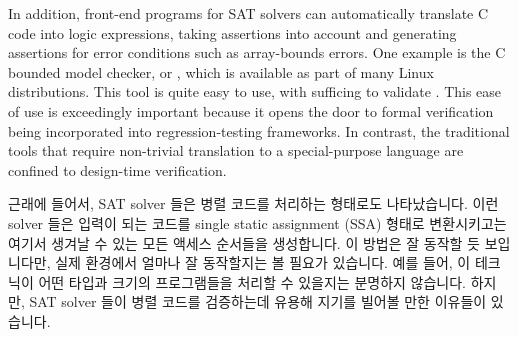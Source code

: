 In addition, front-end programs for SAT solvers can automatically translate
C code into logic expressions, taking assertions into account and generating
assertions for error conditions such as array-bounds errors.
One example is the C bounded model checker, or , which is
available as part of many Linux distributions.
This tool is quite easy to use, with  sufficing to
validate .
This ease of use is exceedingly important because it opens the door
to formal verification being incorporated into regression-testing
frameworks.
In contrast, the traditional tools that require non-trivial translation
to a special-purpose language are confined to design-time verification.
\fi

근래에 들어서, SAT solver 들은 병렬 코드를 처리하는 형태로도 나타났습니다.
이런 solver 들은 입력이 되는 코드를 single static assignment (SSA) 형태로
변환시키고는 여기서 생겨날 수 있는 모든 액세스 순서들을 생성합니다.
이 방법은 잘 동작할 듯 보입니다만, 실제 환경에서 얼마나 잘 동작할지는 볼 필요가
있습니다.
예를 들어, 이 테크닉이 어떤 타입과 크기의 프로그램들을 처리할 수 있을지는
분명하지 않습니다.
하지만, SAT solver 들이 병렬 코드를 검증하는데 유용해 지기를 빌어볼 만한
이유들이 있습니다.
\iffalse

More recently, SAT solvers have appeared that handle parallel code.
These solvers operate by converting the input code into single static
assignment (SSA) form, then generating all permitted access orders.
This approach seems promising, but it remains to be seen how well
it works in practice.
For example, it is not clear what types and sizes of programs this
technique handles.
However, there is some reason to hope that SAT solvers will be useful
for verifying parallel code.
\fi
